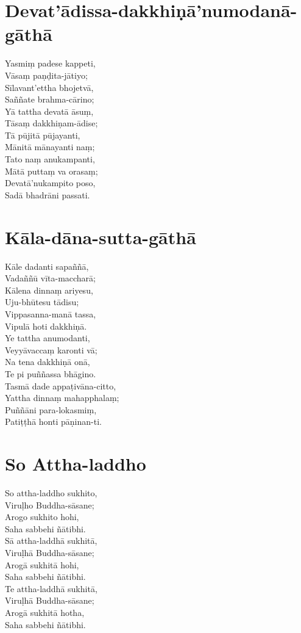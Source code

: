 \chapter{Devat’ādissa-dakkhiṇā’numodanā-gāthā}

Yasmiṃ padese kappeti,\\
Vāsaṃ paṇḍita-jātiyo;\\
Sīlavant’ettha bhojetvā,\\
Saññate brahma-cārino;\\
Yā tattha devatā āsuṃ,\\
Tāsaṃ dakkhiṇam-ādise;\\
Tā pūjitā pūjayanti,\\
Mānitā mānayanti naṃ;\\
Tato naṃ anukampanti,\\
Mātā puttaṃ va orasaṃ;\\
Devatā’nukampito poso,\\
Sadā bhadrāni passati.

\chapter{Kāla-dāna-sutta-gāthā}

Kāle dadanti sapaññā,\\
Vadaññū vīta-maccharā;\\
Kālena dinnaṃ ariyesu,\\
Uju-bhūtesu tādisu;\\
Vippasanna-manā tassa,\\
Vipulā hoti dakkhiṇā.\\
Ye tattha anumodanti,\\
Veyyāvaccaṃ karonti vā;\\
Na tena dakkhiṇā onā,\\
Te pi puññassa bhāgino.\\
Tasmā dade appaṭivāna-citto,\\
Yattha dinnaṃ mahapphalaṃ;\\
Puññāni para-lokasmiṃ,\\
Patiṭṭhā honti pāṇinan-ti.

\chapter{So Attha-laddho}

So attha-laddho sukhito,\\
Viruḷho Buddha-sāsane;\\
Arogo sukhito hohi,\\
Saha sabbehi ñātibhi.\\
Sā attha-laddhā sukhitā,\\
Viruḷhā Buddha-sāsane;\\
Arogā sukhitā hohi,\\
Saha sabbehi ñātibhi.\\
Te attha-laddhā sukhitā,\\
Viruḷhā Buddha-sāsane;\\
Arogā sukhitā hotha,\\
Saha sabbehi ñātibhi.

